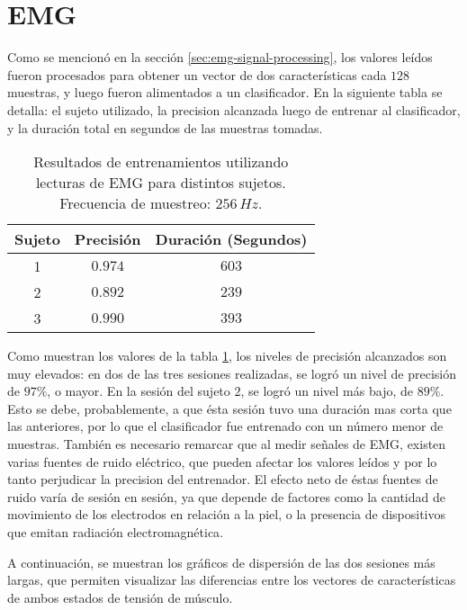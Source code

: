 \section{EMG}

Como se mencionó en la sección \ref{sec:emg-signal-processing}, los valores leídos fueron procesados para obtener un vector de dos características cada $128$ muestras, y luego fueron alimentados a un clasificador. En la siguiente tabla se detalla: el sujeto utilizado, la precision alcanzada luego de entrenar al clasificador, y la duración total en segundos de las muestras tomadas.

\begin{table}[H]
\centering
\begin{tabular}{ |c|c|c| } 
 \hline
 Sujeto & Precisión & Duración (Segundos) \\ 
 \hline
 1 & $0.974$ & $603$ \\
  \hline
 2 & $0.892$ & $239$ \\
  \hline
 3 & $0.990$ & $393$ \\

 \hline
\end{tabular}
\caption{Resultados de entrenamientos utilizando lecturas de EMG para distintos sujetos. Frecuencia de muestreo: $256\,Hz$.}
\label{tab:emg-results}
\end{table}

Como muestran los valores de la tabla \ref{tab:emg-results}, los niveles de precisión alcanzados son muy elevados: en dos de las tres sesiones realizadas, se logró un nivel de precisión de $97\%$, o mayor.  En la sesión del sujeto $2$, se logró un nivel más bajo, de $89\%$. Esto se debe, probablemente, a que ésta sesión tuvo una duración mas corta que las anteriores, por lo que el clasificador fue entrenado con un número menor de muestras. También es necesario remarcar que al medir señales de EMG, existen varias fuentes de ruido eléctrico, que pueden afectar los valores leídos y por lo tanto perjudicar la precision del entrenador. El efecto neto de éstas fuentes de ruido varía de sesión en sesión, ya que depende de factores como la cantidad de movimiento de los electrodos en relación a la piel, o la presencia de dispositivos que emitan radiación electromagnética\cite{emg-delsys}.

A continuación, se muestran los gráficos de dispersión de las dos sesiones más largas, que permiten visualizar las diferencias entre los vectores de características de ambos estados de tensión de músculo.


